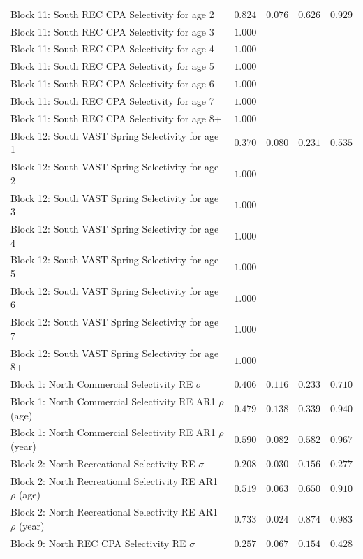 \documentclass[
]{article}
\begin{document}
\begin{landscape}
\begin{longtable}[t]{lrrrr}
Block 11: South REC CPA Selectivity for age 2 & $0.824$ & $0.076$ & $0.626$ & $0.929$\\
Block 11: South REC CPA Selectivity for age 3 & $1.000$ &  &  & \\
Block 11: South REC CPA Selectivity for age 4 & $1.000$ &  &  & \\
Block 11: South REC CPA Selectivity for age 5 & $1.000$ &  &  & \\
\addlinespace
Block 11: South REC CPA Selectivity for age 6 & $1.000$ &  &  & \\
Block 11: South REC CPA Selectivity for age 7 & $1.000$ &  &  & \\
Block 11: South REC CPA Selectivity for age 8+ & $1.000$ &  &  & \\
Block 12: South VAST Spring Selectivity for age 1 & $0.370$ & $0.080$ & $0.231$ & $0.535$\\
Block 12: South VAST Spring Selectivity for age 2 & $1.000$ &  &  & \\
\addlinespace
Block 12: South VAST Spring Selectivity for age 3 & $1.000$ &  &  & \\
Block 12: South VAST Spring Selectivity for age 4 & $1.000$ &  &  & \\
Block 12: South VAST Spring Selectivity for age 5 & $1.000$ &  &  & \\
Block 12: South VAST Spring Selectivity for age 6 & $1.000$ &  &  & \\
Block 12: South VAST Spring Selectivity for age 7 & $1.000$ &  &  & \\
\addlinespace
Block 12: South VAST Spring Selectivity for age 8+ & $1.000$ &  &  & \\
Block 1: North Commercial Selectivity RE $\sigma$ & $0.406$ & $0.116$ & $0.233$ & $0.710$\\
Block 1: North Commercial Selectivity RE AR1 $\rho$ (age) & $0.479$ & $0.138$ & $0.339$ & $0.940$\\
Block 1: North Commercial Selectivity RE AR1 $\rho$ (year) & $0.590$ & $0.082$ & $0.582$ & $0.967$\\
Block 2: North Recreational Selectivity RE $\sigma$ & $0.208$ & $0.030$ & $0.156$ & $0.277$\\
\addlinespace
Block 2: North Recreational Selectivity RE AR1 $\rho$ (age) & $0.519$ & $0.063$ & $0.650$ & $0.910$\\
Block 2: North Recreational Selectivity RE AR1 $\rho$ (year) & $0.733$ & $0.024$ & $0.874$ & $0.983$\\
Block 9: North REC CPA Selectivity RE $\sigma$ & $0.257$ & $0.067$ & $0.154$ & $0.428$\\

\end{longtable}
\end{landscape}
\end{document}
